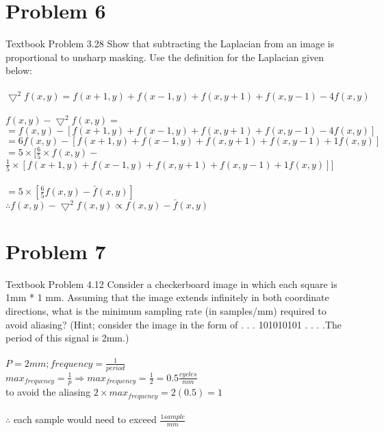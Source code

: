 \documentclass[12pt]{article}
\begin{document}
    \section{Problem 6}
    Textbook Problem 3.28
    Show that subtracting the Laplacian from an image is proportional to unsharp masking. 
    Use the definition for the Laplacian given below:
    \\
    \\
    $\bigtriangledown^{2}f(x,y)= f(x+1, y) + f(x-1,y) + f(x,y+1)+f(x,y-1)-4f(x,y)$ \\
    \\
    $f(x,y)-\bigtriangledown^{2}f(x,y)=$\\
    $=f(x,y)-[f(x+1, y) + f(x-1,y) + f(x,y+1)+f(x,y-1)-4f(x,y)]$\\
    $=6f(x,y)-[f(x+1, y) + f(x-1,y) + f(x,y+1)+f(x,y-1)+1f(x,y)]$\\
    $=5 \times [ \frac{6}{5} \times f(x,y)-$\\
    $ \frac{1}{5} \times [f(x+1, y) + f(x-1,y) + f(x,y+1)+ f(x,y-1)+1f(x,y)]]$\\
    \\
    $=5 \times [\frac{6}{5}f(x,y)-\bar{f}(x,y)]$ \\
    $\therefore  f(x,y) - \bigtriangledown^{2} f(x,y) \propto f(x,y)-\bar{f}(x,y) $
    \section{Problem 7}
    Textbook Problem 4.12
    Consider a checkerboard image in which each square is 1mm * 1 mm. Assuming that the 
    image extends infinitely in both coordinate directions, what is the minimum sampling
     rate (in samples/mm) required to avoid aliasing?
    (Hint; consider the image in the form of . . . 101010101 . . . .The period
     of this signal is 2mm.)
     \\
     \\
     $P= 2mm; frequency = \frac{1}{period}$\\
     $max_{frequency} = \frac{1}{p} \Rightarrow max_{frequency} = \frac{1}{2}= 0.5 \frac{cycles}{mm} $  \\
     to avoid the aliasing $2\times max_{frequency} = 2(0.5) = 1$
     \\
     \\
     $\therefore$ each sample would need to exceed $\frac{1 sample}{mm}$
\end{document}

